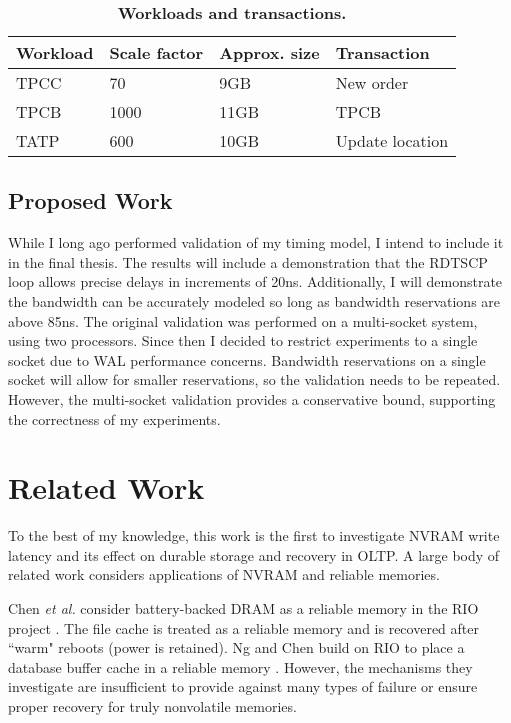 \begin{table}
  \centering
  \begin{tabular}{l l l l}
    \hline
    Workload & Scale factor & Approx. size & Transaction \\
    \hline \hline
    TPCC & 70 & 9GB & New order \\
    TPCB & 1000 & 11GB & TPCB \\
    TATP & 600 & 10GB & Update location \\
    \hline
  \end{tabular}
  \caption{\textbf{Workloads and transactions.}}
  \label{table::Workloads}
\end{table}

\subsection{Proposed Work}
\label{sec:OLTP_design:Methodology:Proposed}

While I long ago performed validation of my timing model, I intend to include it in the final thesis.
The results will include a demonstration that the RDTSCP loop allows precise delays in increments of 20ns.
Additionally, I will demonstrate the bandwidth can be accurately modeled so long as bandwidth reservations are above 85ns.
The original validation was performed on a multi-socket system, using two processors.
Since then I decided to restrict experiments to a single socket due to WAL performance concerns.
Bandwidth reservations on a single socket will allow for smaller reservations, so the validation needs to be repeated.
However, the multi-socket validation provides a conservative bound, supporting the correctness of my experiments.

\section{Related Work}
\label{sec:OLTP_design:RelatedWork}
To the best of my knowledge, this work is the first to investigate NVRAM write latency and its effect on durable storage and recovery in OLTP.
A large body of related work considers applications of NVRAM and reliable memories.

Chen \emph{et al.} consider battery-backed DRAM as a reliable memory in the RIO project \cite{ChenNg96}.
The file cache is treated as a reliable memory and is recovered after ``warm" reboots (power is retained).
Ng and Chen build on RIO to place a database buffer cache in a reliable memory \cite{NgChen97}.
However, the mechanisms they investigate are insufficient to provide against many types of failure or ensure proper recovery for truly nonvolatile memories. 

